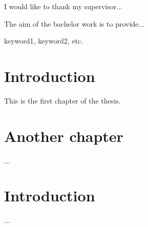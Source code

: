 \documentclass[12pt,oneside,draft]{fithesis2}
\begin{document}
\FrontMatter
\ThesisTitlePage



\begin{ThesisDeclaration}
\DeclarationText
\AdvisorName
\end{ThesisDeclaration}



\begin{ThesisThanks}
I would like to thank my supervisor...
\end{ThesisThanks}



\begin{ThesisAbstract}
The aim of the bachelor work is to provide...
\end{ThesisAbstract}



\begin{ThesisKeyWords}
keyword1, keyword2, etc.
\end{ThesisKeyWords}



\MainMatter

\chapter{Introduction}
This is the first chapter of the thesis.

\chapter{Another chapter}
...



\tableofcontents



\chapter{Introduction}
...



% 
% 
\end{document}
